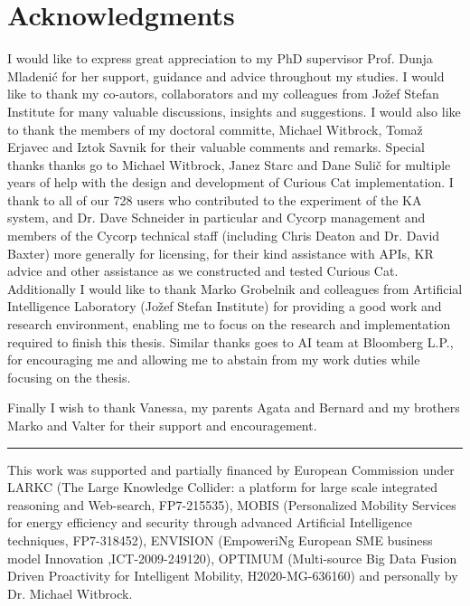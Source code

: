 % 
\chapter*{Acknowledgments}
I would like to express great appreciation to my PhD supervisor Prof. Dunja 
Mladenić for her support, guidance and advice throughout my studies. 
I would like to thank my co-autors, collaborators and
my colleagues from Jožef Stefan Institute for many valuable discussions, 
insights and suggestions. 
I would also like to thank the members of my doctoral committe, 
Michael Witbrock, Tomaž Erjavec and Iztok Savnik for their valuable comments and
remarks. 
Special thanks thanks go to Michael Witbrock, Janez Starc and Dane Sulič for
multiple years of help with the design and development of Curious Cat 
implementation. I thank to all of our 728 users who contributed 
to the experiment of the KA system, and Dr. Dave Schneider in particular and 
Cycorp management and members of the Cycorp technical staff (including Chris 
Deaton and Dr. David Baxter) more generally for licensing, for their kind 
assistance with APIs, KR advice and other assistance as we constructed and 
tested Curious Cat.
Additionally I would like to thank Marko Grobelnik and colleagues from
Artificial Intelligence Laboratory (Jožef Stefan Institute) for providing a 
good work and research environment, enabling me to focus on the research and
implementation required to finish this thesis. Similar thanks goes to AI team
at Bloomberg L.P., for encouraging me and allowing me to abstain from my work
duties while focusing on the thesis.

Finally I wish to thank Vanessa, my parents Agata and Bernard and my brothers
Marko and Valter for their support and encouragement.

\rule{0.5\textwidth}{.4pt}

This work was supported and partially financed by European Commission under
LARKC (The Large Knowledge Collider: a platform for large scale integrated
reasoning and Web-search, FP7-215535), MOBIS (Personalized Mobility Services 
for energy efficiency and security through advanced Artificial Intelligence 
techniques, FP7-318452), ENVISION (EmpoweriNg European SME business model 
Innovation ,ICT-2009-249120), OPTIMUM (Multi-source Big Data Fusion Driven 
Proactivity for Intelligent Mobility, H2020-MG-636160) and personally by 
Dr. Michael Witbrock.
